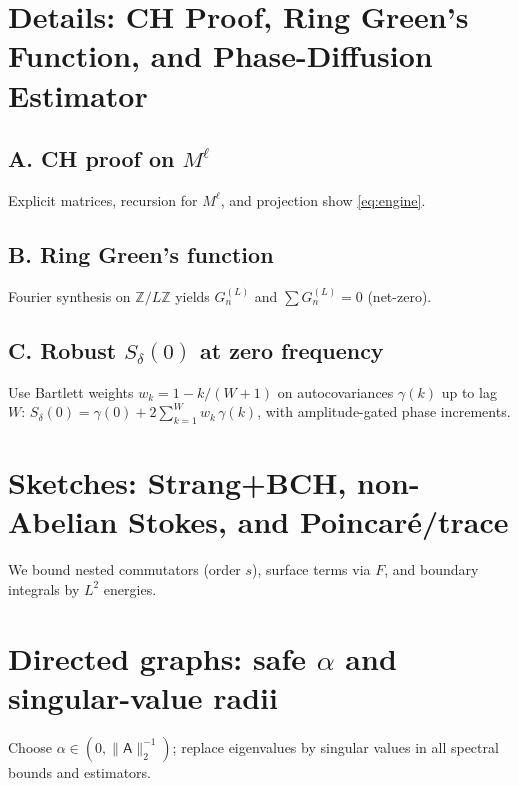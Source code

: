 \documentclass[11pt]{article}
\newcommand{\Adj}{\mathsf{A}}
\begin{document}
\appendix
\section{Details: CH Proof, Ring Green's Function, and Phase-Diffusion Estimator}
\subsection*{A. CH proof on $M^\ell$}
Explicit matrices, recursion for $M^\ell$, and projection show \eqref{eq:engine}.

\subsection*{B. Ring Green's function}
Fourier synthesis on $\mathbb Z/L\mathbb Z$ yields $G^{(L)}_n$ and $\sum G^{(L)}_n=0$ (net-zero).

\subsection*{C. Robust $S_\delta(0)$ at zero frequency}
Use Bartlett weights $w_k=1-k/(W+1)$ on autocovariances $\gamma(k)$ up to lag $W$:
$S_\delta(0)=\gamma(0)+2\sum_{k=1}^{W} w_k\,\gamma(k)$, with amplitude-gated phase increments.

\section{Sketches: Strang+BCH, non-Abelian Stokes, and Poincar\'e/trace}
We bound nested commutators (order $s$), surface terms via $F$, and boundary integrals by $L^2$ energies.

\section{Directed graphs: safe $\alpha$ and singular-value radii}
Choose $\alpha\in(0,\|\Adj\|_2^{-1})$; replace eigenvalues by singular values in all spectral bounds and estimators.
\end{document}
